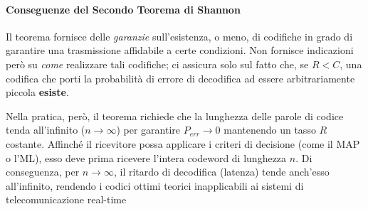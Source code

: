 \paragraph{Conseguenze del Secondo Teorema di Shannon}
Il teorema fornisce delle \textit{garanzie} sull'esistenza, o meno, di codifiche in grado di garantire una trasmissione affidabile a certe condizioni. Non fornisce indicazioni però su \textit{come} realizzare tali codifiche; ci assicura solo sul fatto che, se $R<C$, una codifica che porti la probabilità di errore di decodifica ad essere arbitrariamente piccola \textbf{esiste}.

Nella pratica, però, il teorema richiede che la lunghezza delle parole di codice tenda all'infinito ($n \to \infty$) per garantire $P_{err}\to 0$ mantenendo un tasso $R$ costante. Affinché il ricevitore possa applicare i criteri di decisione (come il MAP o l'ML), esso deve prima ricevere l'intera codeword di lunghezza $n$. Di conseguenza, per $n \to \infty$, il ritardo di decodifica (latenza) tende anch'esso all'infinito, rendendo i codici ottimi teorici inapplicabili ai sistemi di telecomunicazione real-time
